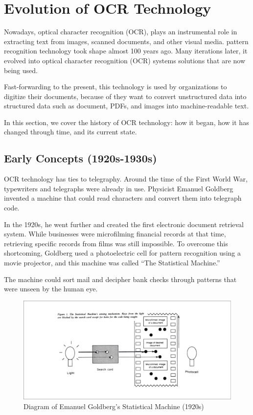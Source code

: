 \section{Evolution of OCR Technology}
\label{sec:synthetic-data}
Nowadays, optical character recognition (OCR), plays an instrumental role in extracting text from images,
scanned documents, and other visual media. pattern recognition technology took shape almost 100 years ago.
Many iterations later, it evolved into optical character recognition (OCR) systems solutions that are
now being used.

Fast-forwarding to the present, this technology is used by organizations to digitize their documents, because
of they want to convert unstructured data into structured data such as document, PDFs, and images into
machine-readable text.

In this section, we cover the history of OCR technology: how it began, 
how it has changed through time, and its current state.

\subsection{Early Concepts (1920s-1930s)}
OCR technology has ties to telegraphy. Around the time of the First World War, 
typewriters and telegraphs were already in use. Physicist Emanuel Goldberg invented a
machine that could read characters and convert them into telegraph code. 

In the 1920s, he went further and created the first electronic document retrieval system. 
While businesses were microfilming financial records at that time, retrieving specific 
records from films was still impossible. To overcome this shortcoming, Goldberg used a 
photoelectric cell for pattern recognition using a movie projector, and this machine was 
called “The Statistical Machine.”  

The machine could sort mail and decipher bank checks through patterns that were unseen by the human eye. 

\begin{figure}[ht]
    \centering
    \includegraphics[width=1\textwidth]{figures/statistical_machine_diagram.png}
    \caption{Diagram of Emanuel Goldberg's Statistical Machine (1920s)}
    \label{fig:statistical-machine}
\end{figure}

